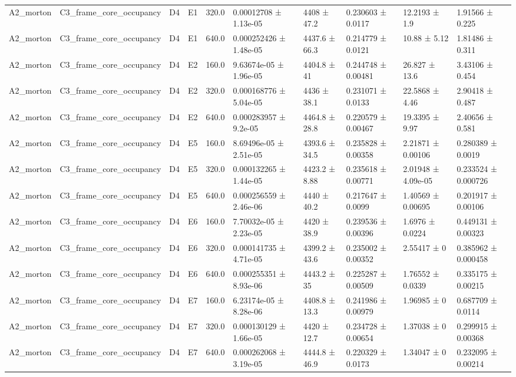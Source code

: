 \begin{table}
\begin{tabular}{llllllllll}
A2\_morton & C3\_frame\_core\_occupancy & D4 & E1 & 320.0 & 0.00012708 ± 1.13e-05 & 4408 ± 47.2 & 0.230603 ± 0.0117 & 12.2193 ± 1.9 & 1.91566 ± 0.225 \\
A2\_morton & C3\_frame\_core\_occupancy & D4 & E1 & 640.0 & 0.000252426 ± 1.48e-05 & 4437.6 ± 66.3 & 0.214779 ± 0.0121 & 10.88 ± 5.12 & 1.81486 ± 0.311 \\
A2\_morton & C3\_frame\_core\_occupancy & D4 & E2 & 160.0 & 9.63674e-05 ± 1.96e-05 & 4404.8 ± 41 & 0.244748 ± 0.00481 & 26.827 ± 13.6 & 3.43106 ± 0.454 \\
A2\_morton & C3\_frame\_core\_occupancy & D4 & E2 & 320.0 & 0.000168776 ± 5.04e-05 & 4436 ± 38.1 & 0.231071 ± 0.0133 & 22.5868 ± 4.46 & 2.90418 ± 0.487 \\
A2\_morton & C3\_frame\_core\_occupancy & D4 & E2 & 640.0 & 0.000283957 ± 9.2e-05 & 4464.8 ± 28.8 & 0.220579 ± 0.00467 & 19.3395 ± 9.97 & 2.40656 ± 0.581 \\
A2\_morton & C3\_frame\_core\_occupancy & D4 & E5 & 160.0 & 8.69496e-05 ± 2.51e-05 & 4393.6 ± 34.5 & 0.235828 ± 0.00358 & 2.21871 ± 0.00106 & 0.280389 ± 0.0019 \\
A2\_morton & C3\_frame\_core\_occupancy & D4 & E5 & 320.0 & 0.000132265 ± 1.44e-05 & 4423.2 ± 8.88 & 0.235618 ± 0.00771 & 2.01948 ± 4.09e-05 & 0.233524 ± 0.000726 \\
A2\_morton & C3\_frame\_core\_occupancy & D4 & E5 & 640.0 & 0.000256559 ± 2.46e-06 & 4440 ± 40.2 & 0.217647 ± 0.0099 & 1.40569 ± 0.00695 & 0.201917 ± 0.00106 \\
A2\_morton & C3\_frame\_core\_occupancy & D4 & E6 & 160.0 & 7.70032e-05 ± 2.23e-05 & 4420 ± 38.9 & 0.239536 ± 0.00396 & 1.6976 ± 0.0224 & 0.449131 ± 0.00323 \\
A2\_morton & C3\_frame\_core\_occupancy & D4 & E6 & 320.0 & 0.000141735 ± 4.71e-05 & 4399.2 ± 43.6 & 0.235002 ± 0.00352 & 2.55417 ± 0 & 0.385962 ± 0.000458 \\
A2\_morton & C3\_frame\_core\_occupancy & D4 & E6 & 640.0 & 0.000255351 ± 8.93e-06 & 4443.2 ± 35 & 0.225287 ± 0.00509 & 1.76552 ± 0.0339 & 0.335175 ± 0.00215 \\
A2\_morton & C3\_frame\_core\_occupancy & D4 & E7 & 160.0 & 6.23174e-05 ± 8.28e-06 & 4408.8 ± 13.3 & 0.241986 ± 0.00979 & 1.96985 ± 0 & 0.687709 ± 0.0114 \\
A2\_morton & C3\_frame\_core\_occupancy & D4 & E7 & 320.0 & 0.000130129 ± 1.66e-05 & 4420 ± 12.7 & 0.234728 ± 0.00654 & 1.37038 ± 0 & 0.299915 ± 0.00368 \\
A2\_morton & C3\_frame\_core\_occupancy & D4 & E7 & 640.0 & 0.000262068 ± 3.19e-05 & 4444.8 ± 46.9 & 0.220329 ± 0.0173 & 1.34047 ± 0 & 0.232095 ± 0.00214 \\

\end{tabular}
\end{table}
